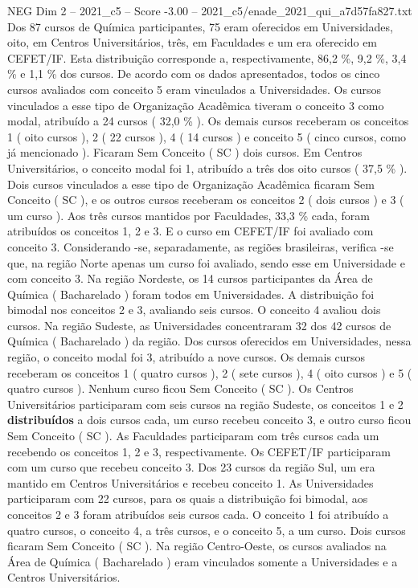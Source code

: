 \begin{textsample}{NEG Dim 2 – 2021\_c5 – Score -3.00 – 2021\_c5/enade\_2021\_qui\_a7d57fa827.txt}
Dos 87 cursos de Química participantes, 75 eram oferecidos em Universidades, oito, em Centros Universitários, três, em Faculdades e um era oferecido em CEFET/IF.
Esta distribuição corresponde a, respectivamente, 86,2 \%, 9,2 \%, 3,4 \% e 1,1 \% dos cursos.
De acordo com os dados apresentados, todos os cinco cursos avaliados com conceito 5 eram vinculados a Universidades.
Os cursos vinculados a esse tipo de Organização Acadêmica tiveram o conceito 3 como modal, atribuído a 24 cursos ( 32,0 \% ).
Os demais cursos receberam os conceitos 1 ( oito cursos ), 2 ( 22 cursos ), 4 ( 14 cursos ) e conceito 5 ( cinco cursos, como já mencionado ).
Ficaram Sem Conceito ( SC ) dois cursos.
Em Centros Universitários, o conceito modal foi 1, atribuído a três dos oito cursos ( 37,5 \% ).
Dois cursos vinculados a esse tipo de Organização Acadêmica ficaram Sem Conceito ( SC ), e os outros cursos receberam os conceitos 2 ( dois cursos ) e 3 ( um curso ).
Aos três cursos mantidos por Faculdades, 33,3 \% cada, foram atribuídos os conceitos 1, 2 e 3.
E o curso em CEFET/IF foi avaliado com conceito 3.
Considerando -se, separadamente, as regiões brasileiras, verifica -se que, na região Norte apenas um curso foi avaliado, sendo esse em Universidade e com conceito 3.
Na região Nordeste, os 14 cursos participantes da Área de Química ( Bacharelado ) foram todos em Universidades.
A distribuição foi bimodal nos conceitos 2 e 3, avaliando seis cursos.
O conceito 4 avaliou dois cursos.
Na região Sudeste, as Universidades concentraram 32 dos 42 cursos de Química ( Bacharelado ) da região.
Dos cursos oferecidos em Universidades, nessa região, o conceito modal foi 3, atribuído a nove cursos.
Os demais cursos receberam os conceitos 1 ( quatro cursos ), 2 ( sete cursos ), 4 ( oito cursos ) e 5 ( quatro cursos ).
Nenhum curso ficou Sem Conceito ( SC ).
Os Centros Universitários participaram com seis cursos na região Sudeste, os conceitos 1 e 2 \textbf{distribuídos} a dois cursos cada, um curso recebeu conceito 3, e outro curso ficou Sem Conceito ( SC ).
As Faculdades participaram com três cursos cada um recebendo os conceitos 1, 2 e 3, respectivamente.
Os CEFET/IF participaram com um curso que recebeu conceito 3.
Dos 23 cursos da região Sul, um era mantido em Centros Universitários e recebeu conceito 1.
As Universidades participaram com 22 cursos, para os quais a distribuição foi bimodal, aos conceitos 2 e 3 foram atribuídos seis cursos cada.
O conceito 1 foi atribuído a quatro cursos, o conceito 4, a três cursos, e o conceito 5, a um curso.
Dois cursos ficaram Sem Conceito ( SC ).
Na região Centro-Oeste, os cursos avaliados na Área de Química ( Bacharelado ) eram vinculados somente a Universidades e a Centros Universitários.

\end{textsample}
